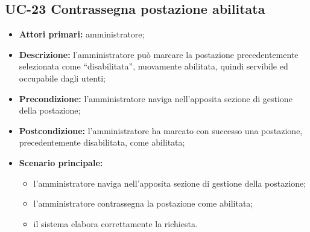 
\subsection{UC-23 Contrassegna postazione abilitata}

\begin{itemize}
\item \textbf{Attori primari:} amministratore;
\item \textbf{Descrizione:} l’amministratore può marcare la postazione precedentemente selezionata come “disabilitata”, nuovamente abilitata, quindi servibile ed occupabile dagli utenti;
\item \textbf{Precondizione:} l’amministratore naviga nell’apposita sezione di gestione della postazione; 
\item \textbf{Postcondizione:} l’amministratore ha marcato con successo una postazione, precedentemente disabilitata, come abilitata;
\item \textbf{Scenario principale:} 
	\begin{itemize}
		\item l’amministratore naviga nell’apposita sezione di gestione della postazione;
		\item l’amministratore contrassegna la postazione come abilitata;
		\item il sistema elabora correttamente la richiesta.
	\end{itemize}
\end{itemize}
